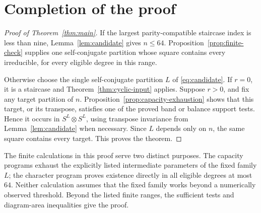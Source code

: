 \section{Completion of the proof}
\label{sec:completion}

\begin{proof}[Proof of Theorem~\ref{thm:main}]
If the largest parity-compatible staircase index is less than nine,
Lemma~\ref{lem:candidate} gives $n\le64$.
Proposition~\ref{prop:finite-check} supplies one self-conjugate
partition whose square contains every irreducible, for every eligible
degree in this range.

Otherwise choose the single self-conjugate partition $L$ of
\eqref{eq:candidate}. If $r=0$, it is a staircase and
Theorem~\ref{thm:cyclic-input} applies. Suppose $r>0$, and fix any
target partition of $n$. Proposition~\ref{prop:capacity-exhaustion}
shows that this target, or its transpose, satisfies one of the
proved band or balance support tests. Hence it occurs in
$S^L\otimes S^L$, using transpose invariance from
Lemma~\ref{lem:candidate} when necessary. Since $L$ depends only on
$n$, the same square contains every target. This proves the theorem.
\end{proof}

The finite calculations in this proof serve two distinct purposes.
The capacity programs exhaust the explicitly listed intermediate
parameters of the fixed family $L$; the character program proves
existence directly in all eligible degrees at most $64$.
Neither calculation assumes that the fixed family works beyond a
numerically observed threshold. Beyond the listed finite ranges,
the sufficient tests and diagram-area inequalities give the proof.
